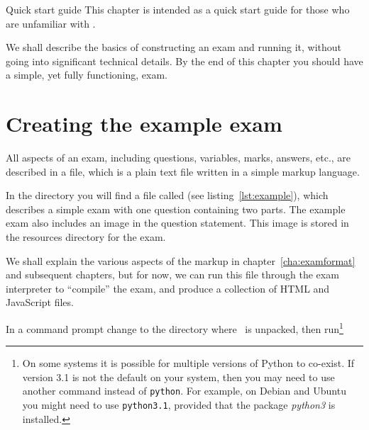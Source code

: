 %
%
%

\begin{chapter}{\label{cha:quickstart}Quick start guide}
  This chapter is intended as a quick start guide for those who are unfamiliar
  with \numbas.

  We shall describe the basics of constructing an exam and running it, without
  going into significant technical details.  By the end of this chapter you
  should have a simple, yet fully functioning, exam.

  \section{\label{sec:examfile}Creating the example exam}
  All aspects of an exam, including questions, variables, marks, answers, etc.,
  are described in a  file, which is a plain text file written
  in a simple markup language.

  In the  directory you will find a file called
   (see listing~\ref{lst:example}), which describes a
  simple exam with one question containing two parts.  The example exam also
  includes an image in the question statement.  This image is stored in the
  resources directory for the exam.
  \lstset{
    basicstyle=\ttfamily\footnotesize,
    numbers=left,
    numberstyle=\tiny,
    breaklines=true,
    breakatwhitespace=true
  }
  
  We shall explain the various aspects of the markup in
  chapter~\ref{cha:examformat} and subsequent chapters, but for now, we can
  run this file through the exam interpreter to ``compile'' the exam,
  and produce a collection of HTML and JavaScript files.

  In a command prompt change to the directory where \numbas\ is unpacked, then
  run\footnote{On some systems it is possible for multiple versions of Python
  to co-exist.  If version 3.1 is not the default on your system, then you may
  need to use another command instead of \texttt{python}.  For example, on
  Debian and Ubuntu you might need to use \texttt{python3.1}, provided that the
  package \textit{python3} is installed.}


\end{chapter}
